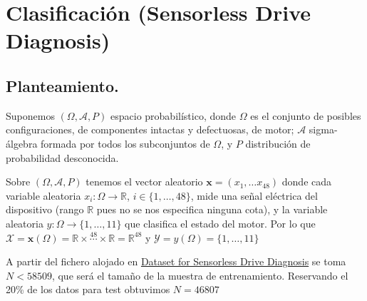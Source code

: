 \documentclass[11pt,a4paper]{article}
\theoremstyle{definition}
\newcommand{\R}{\mathbb{R}}
\begin{document}
	
	\newpage
	
	\section{Clasificación (Sensorless Drive Diagnosis)}
	\subsection{Planteamiento.}
	Suponemos $(\Omega, \mathcal{A}, P)$ espacio probabilístico, donde $\Omega$ es el conjunto de posibles configuraciones, de componentes intactas y defectuosas, de motor; $\mathcal{A}$ sigma-álgebra formada por todos los subconjuntos de $\Omega$, y $P$ distribución de probabilidad desconocida.
	
	Sobre $(\Omega, \mathcal{A}, P)$ tenemos el vector aleatorio $\mathbf{x}=(x_1,\ldots x_{48})$ donde cada variable aleatoria $x_i\colon \Omega \to \R$, $i\in \{1,\ldots,48\}$, mide una señal eléctrica del dispositivo (rango $\R$ pues no se nos especifica ninguna cota), y la variable aleatoria $y\colon \Omega \to \{1,\ldots, 11\}$ que clasifica el estado del motor. Por lo que $\mathcal{X}=\mathbf{x}(\Omega)=\R \times \stackrel{48}{\cdots} \times \R = \R^{48}$ y $\mathcal{Y}=y(\Omega)=\{1,\ldots,11\}$
	
	A partir del fichero alojado en \href{https://archive.ics.uci.edu/ml/datasets/Dataset+for+Sensorless+Drive+Diagnosis#}{Dataset for Sensorless Drive Diagnosis} se toma $N < 58509$, que será el tamaño de la muestra de entrenamiento. Reservando el 20\% de los datos para test obtuvimos $N=46807 \iffalse- k\fi$%
	
\end{document}
